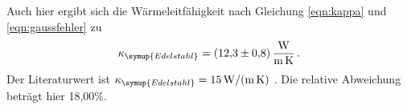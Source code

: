 Auch hier ergibt sich die Wärmeleitfähigkeit nach Gleichung \eqref{eqn:kappa}
und \eqref{eqn:gaussfehler} zu
\begin{align}
  \kappa_{\symup{Edelstahl}} = \SI{12.3(08)}{\watt\per\meter\per\kelvin}\,.\nonumber
\end{align}
Der Literaturwert ist $\kappa_{\symup{Edelstahl}} = \SI{15}{\watt\per\meter\per\kelvin}$
\cite{Wärmeleitfähigkeit3}.
Die relative Abweichung beträgt hier 18,00\%.
